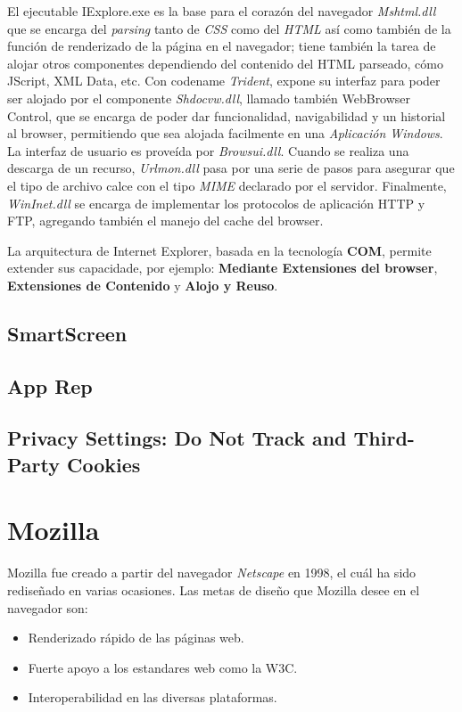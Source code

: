         
        El ejecutable IExplore.exe es la base para el corazón del navegador \textit{Mshtml.dll} que se encarga del \textit{parsing} tanto de \textit{CSS} como del \textit{HTML} así como también de la función de renderizado de la página en el navegador; tiene también la tarea de alojar otros componentes dependiendo del contenido del HTML parseado, cómo JScript, XML Data, etc. Con codename \textit{Trident}, expone su interfaz para poder ser alojado por el componente \textit{Shdocvw.dll}, llamado también WebBrowser Control, que se encarga de poder dar funcionalidad, navigabilidad y un historial al browser, permitiendo que sea alojada facilmente en una \textit{Aplicación Windows}. La interfaz de usuario es proveída por \textit{Browsui.dll}. Cuando se realiza una descarga de un recurso, \textit{Urlmon.dll} pasa por una serie de pasos para asegurar que el tipo de archivo calce con el tipo \textit{MIME} declarado por el servidor. Finalmente, \textit{WinInet.dll} se encarga de implementar los protocolos de aplicación HTTP y FTP, agregando también el manejo del cache del browser.
        
        La arquitectura de Internet Explorer, basada en la tecnología \textbf{COM}, permite extender sus capacidade, por ejemplo: \textbf{Mediante Extensiones del browser}, \textbf{Extensiones de Contenido} y \textbf{Alojo y Reuso}.

\subsection{SmartScreen}

\subsection{App Rep}

\subsection{Privacy Settings: Do Not Track and Third-Party Cookies}

\section{Mozilla}

Mozilla fue creado a partir del navegador \textit{Netscape} en 1998, el cuál ha sido rediseñado en varias ocasiones. Las metas de diseño que Mozilla desee en el navegador son:
        \begin{itemize}
            \item Renderizado rápido de las páginas web.
            \item Fuerte apoyo a los estandares web como la W3C.
            \item Interoperabilidad en las diversas plataformas.
        \end{itemize}
        
